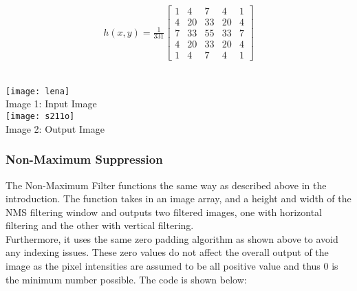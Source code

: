 \documentclass{article}
\begin{document}
	\begin{align*}
	h(x,y) = \frac{1}{331}\left[
	\begin{matrix}
	1 & 4 & 7 & 4 & 1\\
	4 & 20 & 33 & 20 & 4\\
	7 & 33 & 55 & 33 & 7\\
	4 & 20 & 33 & 20 & 4\\
	1 & 4 & 7 & 4 & 1
	\end{matrix}
	\right]
	\end{align*}\\
	
	\begin{center}
		\noindent \texttt{[image: lena]}\\
		Image 1: Input Image\\
		
		\texttt{[image: s211o]}\\
		Image 2: Output Image\\
	\end{center}
	
	\subsubsection{Non-Maximum Suppression}
	
	The Non-Maximum Filter functions the same way as described above in the introduction. The function takes in an image array, and a height and width of the NMS filtering window and outputs two filtered images, one with horizontal filtering and the other with vertical filtering.\\
	
	Furthermore, it uses the same zero padding algorithm as shown above to avoid any indexing issues. These zero values do not affect the overall output of the image as the pixel intensities are assumed to be all positive value and thus 0 is the minimum number possible. The code is shown below:\\
	
\end{document}

